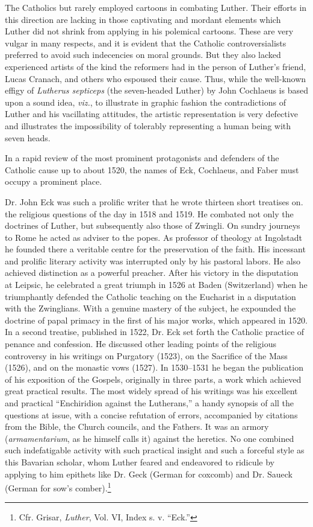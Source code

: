The Catholics but rarely employed cartoons in combating Luther.
Their efforts in this direction are lacking in those captivating and
mordant elements which Luther did not shrink from applying in his
polemical cartoons. These are very vulgar in many respects, and it is
evident that the Catholic controversialists preferred to avoid such indecencies
on moral grounds. But they also lacked experienced artists
of the kind the reformers had in the person of Luther’s friend, Lucas
Cranach, and others who espoused their cause. Thus, while the well-known
effigy of \textit{Lutherus septiceps} (the seven-headed Luther) by
John Cochlaeus is based upon a sound idea, \textit{viz.}, to illustrate in
graphic fashion the contradictions of Luther and his vacillating attitudes,
the artistic representation is very defective and illustrates the
impossibility of tolerably representing a human being with seven heads.

In a rapid review of the most prominent protagonists and defenders of the
Catholic cause up to about 1520, the names of Eck, Cochlaeus,
and Faber must occupy a prominent place.

Dr. John Eck was such a prolific writer that he wrote thirteen
short treatises on. the religious questions of the day in 1518 and 1519.
He combated not only the doctrines of Luther, but subsequently also
those of Zwingli. On sundry journeys to Rome he acted as adviser
to the popes. As professor of theology at Ingolstadt he founded there
a veritable centre for the preservation of the faith. His incessant and
prolific literary activity was interrupted only by his pastoral labors. He
also achieved distinction as a powerful preacher. After his victory in
the disputation at Leipsic, he celebrated a great triumph in 1526 at
Baden (Switzerland) when he triumphantly defended the Catholic
teaching on the Eucharist in a disputation with the Zwinglians. With
a genuine mastery of the subject, he expounded the doctrine of papal
primacy in the first of his major works, which appeared in 1520. In
a second treatise, published in 1522, Dr. Eck set forth the Catholic
practice of penance and confession. He discussed other leading points
of the religious controversy in his writings on Purgatory (1523), on
the Sacrifice of the Mass (1526), and on the monastic vows (1527). In
1530--1531 he began the publication of his exposition of the Gospels,
originally in three parts, a work which achieved great practical results.
The most widely spread of his writings was his excellent and practical
“Enchiridion against the Lutherans,” a handy synopsis of all the
questions at issue, with a concise refutation of errors, accompanied by
citations from the Bible, the Church councils, and the Fathers. It was
an armory (\textit{armamentarium}, as he himself calls it) against the heretics.
No one combined such indefatigable activity with such practical
insight and such a forceful style as this Bavarian scholar, whom
Luther feared and endeavored to ridicule by applying to him epithets like
Dr. Geck (German for coxcomb) and Dr. Saueck (German for sow’s comber).\footnote
{Cfr. Grisar, \textit{Luther}, Vol. VI, Index s. v. “Eck.”}

